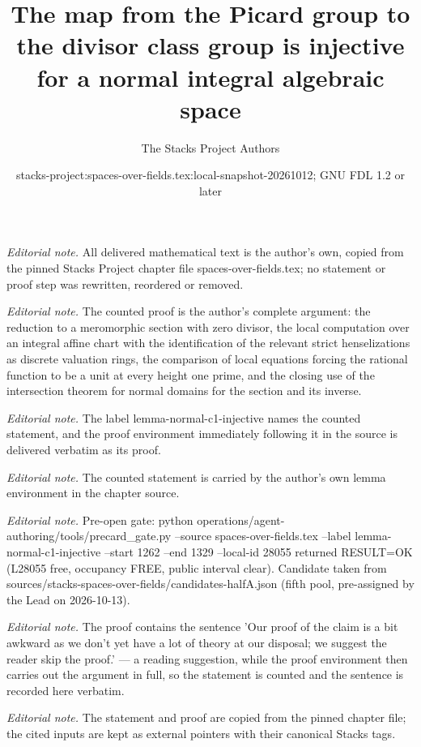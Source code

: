 \documentclass[10pt,a4paper]{amsart}
\title{The map from the Picard group to the divisor class group is injective for a normal integral algebraic space}
\author{The Stacks Project Authors}
\date{stacks-project:spaces-over-fields.tex:local-snapshot-20261012; GNU FDL 1.2 or later}
\theoremstyle{plain}
\theoremstyle{definition}
\theoremstyle{remark}
\numberwithin{equation}{subsection}
\begin{document}
\maketitle
\noindent\textit{Editorial note.} All delivered mathematical text is the author's own, copied from the pinned Stacks Project chapter file spaces-over-fields.tex; no statement or proof step was rewritten, reordered or removed.\par\medskip
\noindent\textit{Editorial note.} The counted proof is the author's complete argument: the reduction to a meromorphic section with zero divisor, the local computation over an integral affine chart with the identification of the relevant strict henselizations as discrete valuation rings, the comparison of local equations forcing the rational function to be a unit at every height one prime, and the closing use of the intersection theorem for normal domains for the section and its inverse.\par\medskip
\noindent\textit{Editorial note.} The label lemma-normal-c1-injective names the counted statement, and the proof environment immediately following it in the source is delivered verbatim as its proof.\par\medskip
\noindent\textit{Editorial note.} The counted statement is carried by the author's own lemma environment in the chapter source.\par\medskip
\noindent\textit{Editorial note.} Pre-open gate: python operations/agent-authoring/tools/precard\_gate.py --source spaces-over-fields.tex --label lemma-normal-c1-injective --start 1262 --end 1329 --local-id 28055 returned RESULT=OK (L28055 free, occupancy FREE, public interval clear). Candidate taken from sources/stacks-spaces-over-fields/candidates-halfA.json (fifth pool, pre-assigned by the Lead on 2026-10-13).\par\medskip
\noindent\textit{Editorial note.} The proof contains the sentence 'Our proof of the claim is a bit awkward as we don't yet have a lot of theory at our disposal; we suggest the reader skip the proof.' — a reading suggestion, while the proof environment then carries out the argument in full, so the statement is counted and the sentence is recorded here verbatim.\par\medskip
\noindent\textit{Editorial note.} The statement and proof are copied from the pinned chapter file; the cited inputs are kept as external pointers with their canonical Stacks tags.\par\medskip
\end{document}
